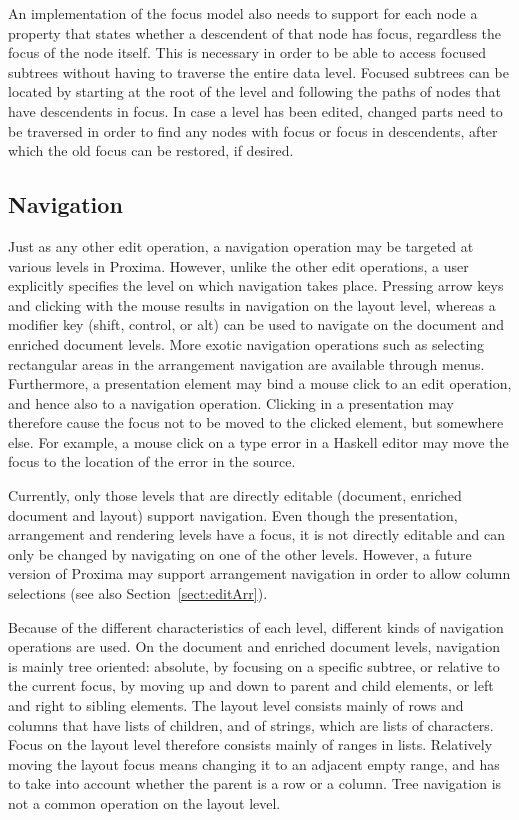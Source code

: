 An implementation of the focus model also needs to support for each node a property that states whether a descendent of that node has focus, regardless the focus of the node itself. This is necessary in order to be able to access focused subtrees without having to traverse the entire data level. Focused subtrees can be located by starting at the root of the level and following the paths of nodes that have descendents in focus.  In case a level has been edited, changed parts need to be traversed in order to find any nodes with focus or focus in descendents, after which the old focus can be restored, if desired.


%																
\subsection{Navigation}

Just as any other edit operation, a navigation operation may be targeted at various levels in Proxima. However, unlike the other edit operations, a user explicitly specifies the level on which navigation takes place. Pressing arrow keys and clicking with the mouse results in navigation on the layout level, whereas a modifier key (shift, control, or alt) can be used to navigate on the document and enriched document levels. \bc More exotic navigation operations such as selecting rectangular areas in the arrangement navigation are available through menus. \ec Furthermore, a presentation element may bind a mouse click to an edit operation, and hence also to a navigation operation. Clicking in a presentation may therefore cause the focus not to be moved to the clicked element, but somewhere else. For example, a mouse click on a type error in a Haskell editor may move the focus to the location of the error in the source.

Currently, only those levels that are directly editable (document, enriched document and layout) support navigation. Even though the presentation, arrangement and rendering levels have a focus, it is not directly editable and can only be changed by navigating on one of the other levels. However, a future version of Proxima may support arrangement navigation in order to allow column selections (see also Section~\ref{sect:editArr}).

Because of the different characteristics of each level, different kinds of navigation operations are used. On the document and enriched document levels, navigation is mainly tree oriented: absolute, by focusing on a specific subtree, or relative to the current focus, by moving up and down to parent and child elements, or left and right to sibling elements. The layout level consists mainly of rows and columns that have lists of children, and of strings, which are lists of characters. Focus on the layout level therefore consists mainly of ranges in lists. Relatively moving the layout focus means changing it to an adjacent empty range, and has to take into account whether the parent is a row or a column. Tree navigation is not a common operation on the layout level.

